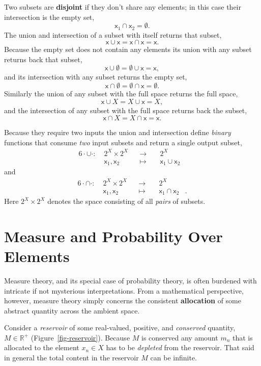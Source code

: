 \documentclass[
  letterpaper,
  DIV=11,
  numbers=noendperiod]{scrartcl}
\begin{document}
Two subsets are \textbf{disjoint} if they don't share any elements; in
this case their intersection is the empty set, \[
\mathsf{x}_{1} \cap \mathsf{x}_{2} = \emptyset.
\] The union and intersection of a subset with itself returns that
subset, \[
\mathsf{x} \cup \mathsf{x} = \mathsf{x} \cap \mathsf{x} = \mathsf{x}.
\] Because the empty set does not contain any elements its union with
any subset returns back that subset, \[
\mathsf{x} \cup \emptyset = \emptyset \cup \mathsf{x} = \mathsf{x},
\] and its intersection with any subset returns the empty set, \[
\mathsf{x} \cap \emptyset = \emptyset \cap \mathsf{x} = \emptyset.
\] Similarly the union of any subset with the full space returns the
full space, \[
\mathsf{x} \cup X = X \cup \mathsf{x} = X,
\] and the intersection of any subset with the full space returns back
the subset, \[
\mathsf{x} \cap X = X \cap \mathsf{x} = \mathsf{x}.
\]

Because they require two inputs the union and intersection define
\emph{binary} functions that consume \emph{two} input subsets and return
a single output subset, \begin{alignat*}{6}
\cdot \cup \cdot :\; & 2^{X} \times 2^{X}& &\rightarrow& \; & 2^{X} &
\\
& \mathsf{x}_1, \mathsf{x}_{2} & &\mapsto& & \mathsf{x}_1 \cup \mathsf{x}_2 &
\end{alignat*} and \begin{alignat*}{6}
\cdot \cap \cdot :\; & 2^{X} \times 2^{X}& &\rightarrow& \; & 2^{X} &
\\
& \mathsf{x}_1, \mathsf{x}_{2} & &\mapsto& & \mathsf{x}_1 \cap \mathsf{x}_2 &.
\end{alignat*} Here \(2^{X} \times 2^{X}\) denotes the space consisting
of all \emph{pairs} of subsets.

\hypertarget{measure-and-probability-over-elements}{%
\section{Measure and Probability Over
Elements}\label{measure-and-probability-over-elements}}

Measure theory, and its special case of probability theory, is often
burdened with intricate if not mysterious interpretations. From a
mathematical perspective, however, measure theory simply concerns the
consistent \textbf{allocation} of some abstract quantity across the
ambient space.

Consider a \emph{reservoir} of some real-valued, positive, and
\emph{conserved} quantity, \(M \in \mathbb{R}^{+}\)
(Figure~\ref{fig-reservoir}). Because \(M\) is conserved any amount
\(m_{n}\) that is allocated to the element \(x_{n} \in X\) has to be
\emph{depleted} from the reservoir. That said in general the total
content in the reservoir \(M\) can be infinite.
\end{document}
